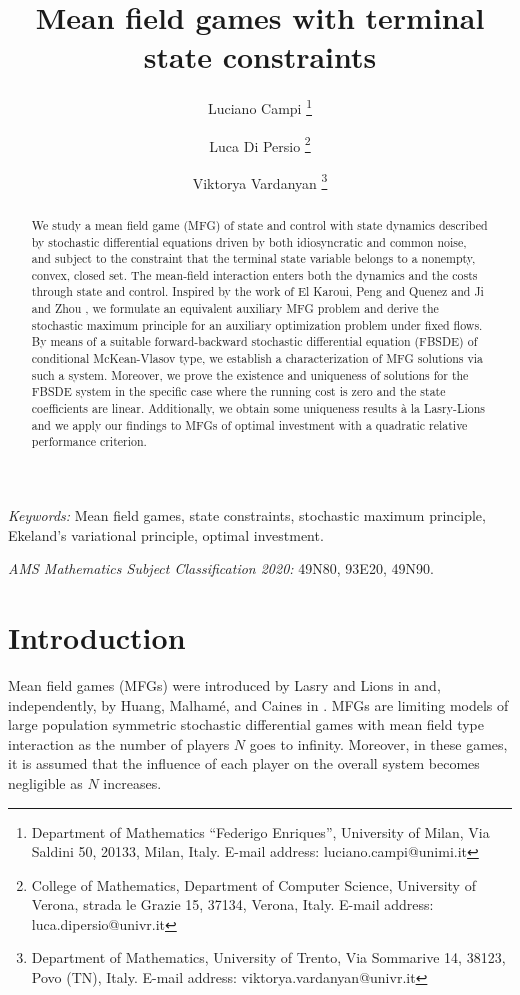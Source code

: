 \documentclass[11pt,a4paper]{article}
\title{Mean field games with terminal state constraints}
\author{Luciano Campi \footnote{Department of Mathematics ``Federigo Enriques'', University of Milan, Via Saldini 50, 20133, Milan, Italy. E-mail address: luciano.campi@unimi.it}
\and Luca Di Persio \footnote{College of Mathematics, 
		Department of Computer Science, University of Verona, strada le Grazie 15, 37134, Verona, Italy. E-mail address: luca.dipersio@univr.it}
	\and Viktorya Vardanyan \footnote{Department of Mathematics, University of Trento, Via Sommarive 14, 38123,  Povo (TN), Italy. E-mail address: viktorya.vardanyan@univr.it}
}
\date{} %
\providecommand{\keywords}[1]
{
	\small	
	\textit{Keywords:} #1
}
\providecommand{\subjclass}[2][2020]
{
	\small
	\emph{AMS Mathematics Subject Classification 2020:} #2
}
\begin{document}
	\maketitle
	
\begin{abstract} 
		
We study a mean field game (MFG) of state and control with state dynamics described by stochastic differential equations driven by both idiosyncratic and common noise, and subject to the constraint that the terminal state variable belongs to a nonempty, convex, closed set. The mean-field interaction enters both the dynamics and the costs through state and control. Inspired by the work of El Karoui, Peng and Quenez \cite{Karoui Peng} and Ji and Zhou \cite{Ji Zhou}, we formulate an equivalent auxiliary MFG problem and derive the stochastic maximum principle for an auxiliary optimization problem under fixed flows. By means of a suitable forward-backward stochastic differential equation (FBSDE) of conditional McKean-Vlasov type, we establish a characterization of MFG solutions via such a system. Moreover, we prove the existence and uniqueness of solutions for the FBSDE system in the specific case where the running cost is zero and the state coefficients are linear. Additionally, we obtain some uniqueness results \`a la Lasry-Lions and we apply our findings to MFGs of optimal investment with a quadratic relative performance criterion. 
\end{abstract}
	
\keywords{Mean field games, state constraints, stochastic maximum principle, Ekeland's variational principle, optimal investment.}\smallskip

\subjclass[2020]{49N80, 93E20, 49N90.} 
	
	
\section{Introduction}
Mean field games (MFGs) were introduced by Lasry and Lions in \cite{Lasry Lions} and, independently, by Huang, Malham\'e, and Caines in \cite{Huang}. MFGs are limiting models of large population symmetric stochastic differential games with mean field type interaction as the number of players $N$ goes to infinity. Moreover, in these games, it is assumed that the influence of each player on the overall system becomes negligible as $N$ increases.
\end{document}
